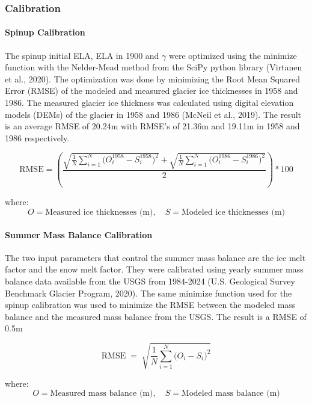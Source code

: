 \documentclass{article}
\begin{document}
\subsubsection{Calibration} 
\paragraph{Spinup Calibration}
The spinup initial ELA, ELA in 1900 and $\gamma$ were optimized using the minimize function with the Nelder-Mead method from the SciPy python library (Virtanen et al., 2020).
The optimization was done by minimizing the Root Mean Squared Error (RMSE) of the modeled and measured glacier ice thicknesses in 1958 and 1986. 
The measured glacier ice thickness was calculated using digital elevation models (DEMs) of the glacier in 1958 and 1986 (McNeil et al., 2019).  
The result is an average RMSE of 20.24m with RMSE's of 21.36m and 19.11m in 1958 and 1986 respectively.

\begin{equation}
    \mathrm{RMSE} = \left(\frac{\sqrt{\frac{1}{N} \sum_{i=1}^{N} \bigl(O^{1958}_i - S^{1958}_i\bigr)^2}+\sqrt{\frac{1}{N} \sum_{i=1}^{N} \bigl(O^{1986}_i - S^{1986}_i\bigr)^2}}{2} \right)*100 \label{tab:rmse_spinup_eq}
\end{equation}

\noindent where:
$$O = \text{Measured ice thicknesses (m)}, \quad S=\text{Modeled ice thicknesses (m)}$$

\paragraph{Summer Mass Balance Calibration}
The two input parameters that control the summer mass balance are the ice melt factor and the snow melt factor. They were calibrated using yearly summer 
mass balance data available from the USGS from 1984-2024 (U.S. Geological Survey Benchmark Glacier Program, 2020). The same minimize function used for the spinup calibration was used to 
minimize the RMSE between the modeled mass balance and the measured mass balance from the USGS. The result is a RMSE of 0.5m

\begin{equation}
    \mathrm{RMSE} \;=\; \sqrt{\frac{1}{N} \sum_{i=1}^{N} \bigl(O_i - S_i\bigr)^2} \label{tab:rmse_mb_eq}
\end{equation}
    
\noindent where:
$$O = \text{Measured mass balance (m)}, \quad S=\text{Modeled mass balance (m)}$$
\end{document}
